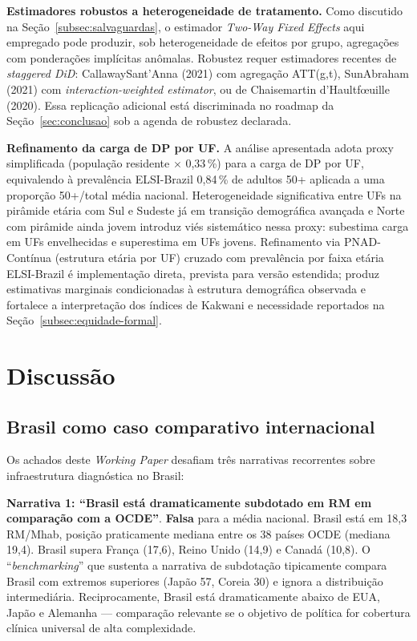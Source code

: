 \documentclass[12pt,a4paper,oneside]{article}
\begin{document}
\textbf{Estimadores robustos a heterogeneidade de tratamento.}
Como discutido na Seção~\ref{subsec:salvaguardas}, o estimador
\textit{Two-Way Fixed Effects} aqui empregado pode produzir,
sob heterogeneidade de efeitos por grupo, agregações com
ponderações implícitas anômalas. Robustez requer estimadores
recentes de \textit{staggered DiD}: Callaway\textendash Sant'Anna
(2021) com agregação ATT(g,t), Sun\textendash Abraham (2021) com
\textit{interaction-weighted estimator}, ou de Chaisemartin\textendash
d'Haultfœuille (2020). Essa replicação adicional está
discriminada no roadmap da Seção~\ref{sec:conclusao} sob a
agenda de robustez declarada.

\textbf{Refinamento da carga de DP por UF.} A análise apresentada
adota proxy simplificada (população residente $\times$ 0,33\,\%)
para a carga de DP por UF, equivalendo à prevalência ELSI-Brazil
0,84\,\% de adultos 50+ aplicada a uma proporção 50+/total média
nacional. Heterogeneidade significativa entre UFs na pirâmide
etária \textemdash{} com Sul e Sudeste já em transição
demográfica avançada e Norte com pirâmide ainda jovem
\textemdash{} introduz viés sistemático nessa proxy: subestima
carga em UFs envelhecidas e superestima em UFs jovens. Refinamento
via PNAD-Contínua (estrutura etária por UF) cruzado com
prevalência por faixa etária ELSI-Brazil é implementação direta,
prevista para versão estendida; produz estimativas marginais
condicionadas à estrutura demográfica observada e fortalece a
interpretação dos índices de Kakwani e necessidade reportados na
Seção~\ref{subsec:equidade-formal}.

\section{Discussão}\label{sec:discussao}

\subsection{Brasil como caso comparativo internacional}

Os achados deste \textit{Working Paper} desafiam três narrativas
recorrentes sobre infraestrutura diagnóstica no Brasil:

\textbf{Narrativa 1: ``Brasil está dramaticamente subdotado em
RM em comparação com a OCDE''}. \textbf{Falsa} para a média nacional.
Brasil está em 18,3 RM/Mhab, posição praticamente mediana entre os
38 países OCDE (mediana 19,4). Brasil supera França (17,6),
Reino Unido (14,9) e Canadá (10,8). O ``\textit{benchmarking}'' que
sustenta a narrativa de subdotação tipicamente compara Brasil com
extremos superiores (Japão 57, Coreia 30) e ignora a distribuição
intermediária. Reciprocamente, Brasil está dramaticamente abaixo de
EUA, Japão e Alemanha — comparação relevante se o objetivo de
política for cobertura clínica universal de alta complexidade.
\end{document}
